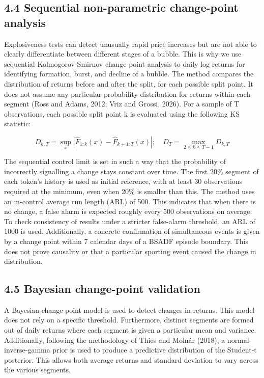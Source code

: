 \documentclass[11pt,a4paper,onecolumn]{article}
\begin{document}
\subsection{4.4 Sequential non-parametric change-point analysis}

Explosiveness tests can detect unusually rapid price increases but are not able to clearly differentiate between different stages of a bubble. This is why we use sequential Kolmogorov-Smirnov  change-point analysis to daily log returns for identifying formation, burst, and decline of a bubble. The method compares the distribution of returns before and after the split, for each possible split point. It does not assume any particular probability distribution for returns within each segment (Ross and Adams, 2012; Vriz and Grossi, 2026). For a sample of T observations, each possible split point k is evaluated using the following KS statistic: 

\[
D_{k,T}=\sup_x|\widehat F_{1:k}(x)-\widehat F_{k+1:T}(x)|;\quad D_T=\max_{2\leq k\leq T-1}D_{k,T}
\]

The sequential control limit is set in such a way that the probability of incorrectly signalling a change stays constant over time. The first 20\% segment of each token’s history is used as initial reference, with at least 30 observations required at the minimum, even when 20\% is smaller than this. The method uses an in-control average run length (ARL) of 500. This indicates that when there is no change, a false alarm is expected roughly every 500 observations on average. To check consistency of results under a stricter false-alarm threshold, an ARL of 1000 is used. Additionally, a concrete confirmation of simultaneous events is given by a change point within 7 calendar days of a BSADF episode boundary. This does not prove causality or that a particular sporting event caused the change in distribution.

\subsection{4.5 Bayesian change-point validation}

A Bayesian change point model is used to detect changes in returns. This model does not rely on a specific threshold. Furthermore, distinct segments are formed out of daily returns where each segment is given a particular mean and variance. Additionally, following the methodology of Thies and Molnár (2018), a normal-inverse-gamma prior is used to produce a predictive distribution of the Student-t posterior. This allows both average returns and standard deviation to vary across the various segments.
\end{document}
